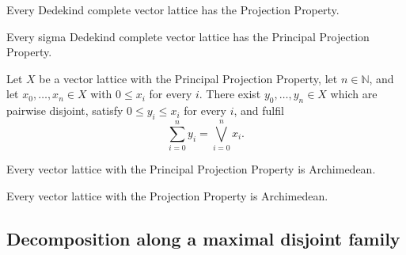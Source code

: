 \begin{theorem}
\label{thm:hasProjectionProperty-of-isOrderComplete}
\leanok
{}
Every Dedekind complete vector lattice has the Projection Property.
\end{theorem}

\begin{theorem}
\label{thm:hasPrincipalProjectionProperty-of-isSigmaOrderComplete}
\leanok
{}
Every sigma Dedekind complete vector lattice has the Principal
Projection Property.
\end{theorem}

\begin{theorem}
\label{thm:exists-disjoint-sum-eq-sup-of-hasPrincipalProjectionProperty}
Let $X$ be a vector lattice with the Principal Projection Property,
let $n \in \mathbb{N}$, and let $x_0, \dots, x_n \in X$ with
$0 \le x_i$ for every $i$. There exist $y_0, \dots, y_n \in X$ which
are pairwise disjoint, satisfy $0 \le y_i \le x_i$ for every $i$, and
fulfil
\[
  \sum_{i=0}^{n} y_i = \bigvee_{i=0}^{n} x_i.
\]
\end{theorem}

\begin{theorem}
\label{thm:isVLArchimedean-of-hasPrincipalProjectionProperty}
Every vector lattice with the Principal Projection Property is
Archimedean.
\end{theorem}

\begin{theorem}
\label{thm:isVLArchimedean-of-hasProjectionProperty}
\leanok
{}
Every vector lattice with the Projection Property is Archimedean.
\end{theorem}

\subsection{Decomposition along a maximal disjoint family}


